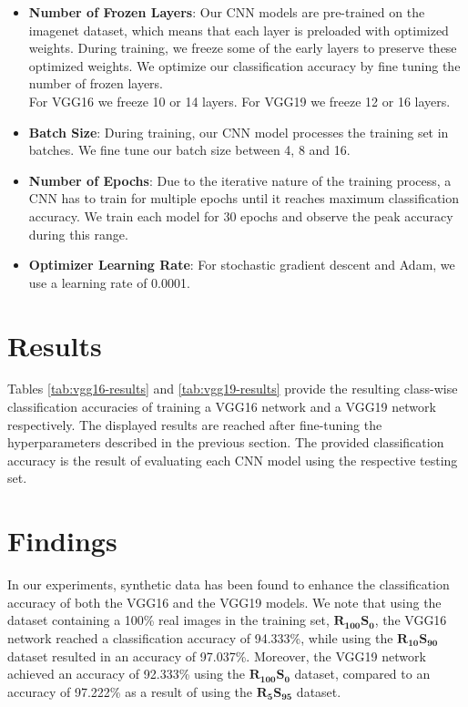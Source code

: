 \begin{itemize}
  \item \textbf{Number of Frozen Layers}: Our CNN models are pre-trained on the imagenet dataset, which means that each layer is preloaded with optimized weights. During training, we freeze some of the early layers to preserve these optimized weights. We optimize our classification accuracy by fine tuning the number of frozen layers.
  \\For VGG16 we freeze 10 or 14 layers. For VGG19 we freeze 12 or 16 layers.
  \item \textbf{Batch Size}: During training, our CNN model processes the training set in batches. We fine tune our batch size between 4, 8 and 16.
  \item \textbf{Number of Epochs}: Due to the iterative nature of the training process, a CNN has to train for multiple epochs until it reaches maximum classification accuracy. We train each model for 30 epochs and observe the peak accuracy during this range.
  \item \textbf{Optimizer Learning Rate}: For stochastic gradient descent and Adam, we use a learning rate of 0.0001.
\end{itemize}


\section{Results}\label{sec:results}

Tables \ref{tab:vgg16-results} and \ref{tab:vgg19-results} provide the resulting class-wise classification accuracies of training a VGG16 network and a VGG19 network respectively. The displayed results are reached after fine-tuning the hyperparameters described in the previous section. The provided classification accuracy is the result of evaluating each CNN model using the respective testing set.


\section{Findings}\label{sec:findings}

In our experiments, synthetic data has been found to enhance the classification accuracy of both the VGG16 and the VGG19 models. We note that using the dataset containing a 100\% real images in the training set, $\boldsymbol{R_{100}S_{0}}$, the VGG16 network reached a classification accuracy of 94.333\%, while using the $\boldsymbol{R_{10}S_{90}}$ dataset resulted in an accuracy of 97.037\%. Moreover, the VGG19 network achieved an accuracy of 92.333\% using the $\boldsymbol{R_{100}S_{0}}$ dataset, compared to an accuracy of 97.222\% as a result of using the $\boldsymbol{R_{5}S_{95}}$ dataset.

